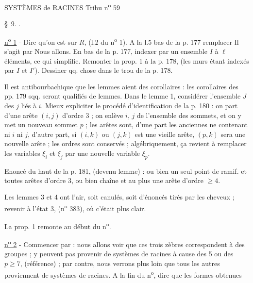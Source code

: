 SYSTÈMES de RACINES \hfill Tribu n\textsuperscript{o} 59

\S~9. .

\uline{n\textsuperscript{o} 1} - Dire qu'on est sur $R$, (l.2 du n\textsuperscript{o} 1). A la l.5 bas de la p. 177 remplacer \textquotedbl{}Il s'agit\textquotedbl{} par \textquotedbl{}Nous allons\textquotedbl{}. En bas de la p. 177, indexer par un ensemble $I$ à $\ell$ éléments, ce qui simplifie. Remonter la prop. 1 à la p. 178, (les murs étant indexés par $I$ et $I'$). Dessiner qq. chose dans le trou de la p. 178.

\unsure{-} Il est antibourbachique que les lemmes aient des corollaires : les corollaires des pp. 179 sqq. seront qualifiés de lemmes. Dans le lemme 1, considérer l'ensemble $J$ des $j$ liés à $i$. Mieux expliciter le procédé d'identification de la p. 180 : on part d'une arête $(i,j)$ d'ordre 3 ; on enlève $i$, $j$ de l'ensemble des sommets, et on y met un nouveau sommet $p$ ; les arêtes sont, d'une part les anciennes ne contenant ni $i$ ni $j$, d'autre part, si $(i,k)$ ou $(j,k)$ est une vieille arête, $(p,k)$ sera une nouvelle arête ; les ordres sont conservés ; algébriquement, ça revient à remplacer les variables $\xi_i$ et $\xi_j$ par une nouvelle variable $\xi_p$.

Enoncé du haut de la p. 181, (devenu lemme) : ou bien un seul point de ramif. et toutes arêtes d'ordre 3, ou bien chaîne et au plus une arête d'ordre $\geq 4$.

Les lemmes 3 et 4 ont l'air, soit canulés, soit d'énoncés tirés par les cheveux ; revenir à l'état 3, (n\textsuperscript{o} 383), où c'était plus clair.

La prop. 1 remonte au début du n\textsuperscript{o}.

\uline{n\textsuperscript{o} 2} - Commencer par : nous allons voir que ces trois zèbres correspondent à des groupes ; y peuvent pas provenir de systèmes de racines à cause des 5 ou des $p\geq 7$, (référence) ; par contre, nous verrons plus loin que tous les autres proviennent de systèmes de racines. A la fin du n\textsuperscript{o}, dire que les formes obtenues

